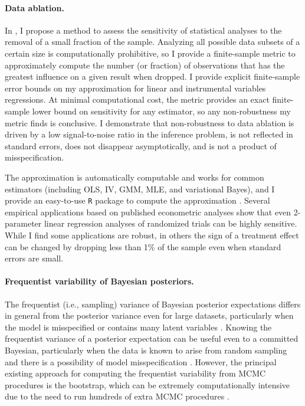 \paragraph{Data ablation.}

In \citet{giordano:2020:amip}, I propose a method to assess the sensitivity of
statistical analyses to the removal of a small fraction of the sample. Analyzing
all possible data subsets of a certain size is computationally prohibitive, so I
provide a finite-sample metric to approximately compute the number (or fraction)
of observations that has the greatest influence on a given result when dropped.
I provide explicit finite-sample error bounds on my approximation for linear
and instrumental variables regressions. At minimal computational cost, the
metric provides an exact finite-sample lower bound on sensitivity for any
estimator, so any non-robustness my metric finds is conclusive. I demonstrate
that non-robustness to data ablation is driven by a low signal-to-noise ratio in
the inference problem, is not reflected in standard errors, does not disappear
asymptotically, and is not a product of misspecification.

The approximation is automatically computable and works for common estimators
(including OLS, IV, GMM, MLE, and variational Bayes), and I provide an
easy-to-use \texttt{R} package to compute the approximation
\citep{zaminfluence}. Several empirical applications based on published
econometric analyses \citep{angelucci:2009:indirect, finkelstein:2012:oregon,
meager:2019:microcredit} show that even 2-parameter linear regression analyses
of randomized trials can be highly sensitive. While I find some applications are
robust, in others the sign of a treatment effect can be changed by dropping less
than 1\% of the sample even when standard errors are small.


\paragraph{Frequentist variability of Bayesian posteriors.}

The frequentist (i.e., sampling) variance of Bayesian posterior expectations
differs in general from the posterior variance even for large datasets,
particularly when the model is misspecified or contains many latent variables
\citep{kleijn:2006:misspecification}.
Knowing the frequentist variance of a posterior expectation can be useful even
to a committed Bayesian, particularly when the data is known to arise from
random sampling and there is a possibility of model misspecification
\citep{waddell:2002:bayesphyloboot}.  However, the
principal existing approach for computing the frequentist variability from MCMC
procedures is the bootstrap, which can be extremely computationally intensive
due to the need to run hundreds of extra MCMC procedures
\citep{huggins:2019:bayesbag}.

